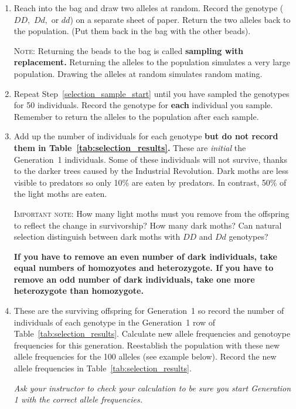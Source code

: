 \documentclass[12pt, hidelinks]{exam}
\newcommand{\allele}[1]{$#1$}
\begin{document}
\begin{questions}
\begin{enumerate}
	\item \label{selection_sample_start} Reach into the bag and draw two alleles at random. Record the genotype (\allele{DD,} \allele{Dd,} or \allele{dd}) on a separate sheet of paper. Return the two alleles back to the population. (Put them back in the bag with the other beads).
	
	\textsc{Note:} Returning the beads to the bag is called \textbf{sampling with replacement.} Returning the alleles to the population simulates a very large population. Drawing the alleles at random simulates random mating.
	
	\item Repeat Step~\ref{selection_sample_start} until you have sampled the genotypes for 50 individuals. Record the genotype for \textbf{each} individual you sample. Remember to return the alleles to the population after each sample. 
	
	\item Add up the number of individuals for each genotype \textbf{ but do not record them in Table~\ref{tab:selection_results}.} These are \emph{initial} the Generation~1 individuals.%
	 Some of these individuals will not survive, thanks to the darker trees caused by the Industrial Revolution. Dark moths are less visible to predators so only 10\% are eaten by predators. In contrast, 50\% of the light moths are eaten. 
	
	\textsc{Important note:} How many light moths must you remove from the offspring to reflect the change in survivorship? How many dark moths? Can natural selection distinguish between dark moths with \allele{DD} and \allele{Dd} genotypes? 
	
	\textbf{If you have to remove an even number of dark individuals, take equal numbers of homozyotes and heterozygote. If you have to remove an odd number of dark individuals, take one more heterozygote than homozygote.}
	
	\item \label{selection_sample_stop} These are the surviving offspring for Generation~1 so record the number of individuals of each genotype in the Generation~1 row of Table~\ref{tab:selection_results}. Calculate new allele frequencies and genotoype frequencies for this generation. Reestablish the population with these new allele frequencies for the 100 alleles (see example below). Record the new allele frequencies in Table~\ref{tab:selection_results}.
	
	\textit{Ask your instructor to check your calculation to be sure you start Generation 1 with the correct allele frequencies.}
	

\end{enumerate}
\end{questions}
\end{document}
